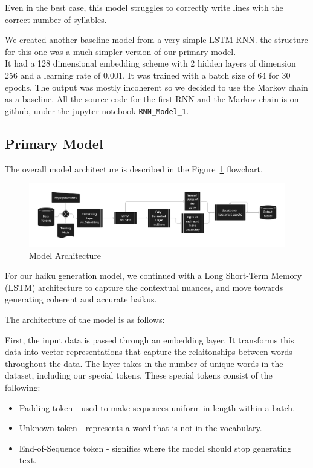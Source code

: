 \documentclass{article} %
\begin{document}
Even in the best case, this model struggles to correctly write lines with the correct number of syllables.

We created another baseline model from a very simple LSTM RNN. the structure for this one was a much simpler version of our primary model.\\

It had a 128 dimensional embedding scheme with 2 hidden layers of dimension 256 and a learning rate of 0.001. It was trained with a batch size of 64
for 30 epochs. The output was mostly incoherent so we decided to use the Markov chain as a baseline. All the source code for the first RNN and the
Markov chain is on github, under the jupyter notebook \texttt{RNN\_Model\_1}.



\subsection{Primary Model}

The overall model architecture is described in the Figure~\ref{fig:flowchart} flowchart.

\begin{figure}[h]
  \begin{center}
  \includegraphics[width=1\textwidth]{Figs/HaikuLSTMArch.png}
  \end{center}
  \caption{Model Architecture}
  \label{fig:flowchart}
\end{figure}

For our haiku generation model, we continued with a Long Short-Term Memory (LSTM) architecture to capture the contextual nuances, and move towards generating coherent and accurate haikus.

The architecture of the model is as follows:

First, the input data is passed through an embedding layer.
It transforms this data into vector representations that capture the
relaitonships between words throughout the data.
The layer takes in the number of unique words in the dataset,
including our special tokens.
These special tokens consist of the following:
\begin{itemize}
  \item Padding token - used to make sequences uniform in length within a batch.
  \item Unknown token - represents a word that is not in the vocabulary.
  \item End-of-Sequence token - signifies where the model should stop generating text.
\end{itemize}
\end{document}
